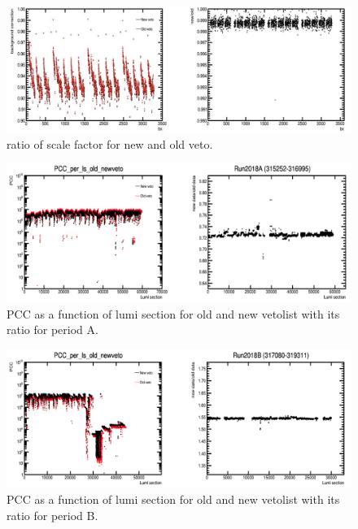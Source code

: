 \begin{figure}[!htp]
\centering
\includegraphics[width=1\textwidth]{ashish_thesis/veto_change_same_af.png}
\caption{%
    ratio of scale factor for new and old veto.
}
\label{fig:af_change_veto}
\end{figure}



\begin{figure}[!htp]
\centering
\includegraphics[width=1\textwidth]{ashish_thesis/Run2018A_old_new_veto.png}
\caption{%
   PCC as a function of lumi section for old and new vetolist with its ratio for period A.
}
\label{fig:old_new_veto_A}
\end{figure}

\begin{figure}[!htp]
\centering
\includegraphics[width=1\textwidth]{ashish_thesis/Run2018B_old_new_veto.png}
\caption{%
    PCC as a function of lumi section for old and new vetolist with its ratio for period B.
}
\label{fig:old_new_veto_B}
\end{figure}


